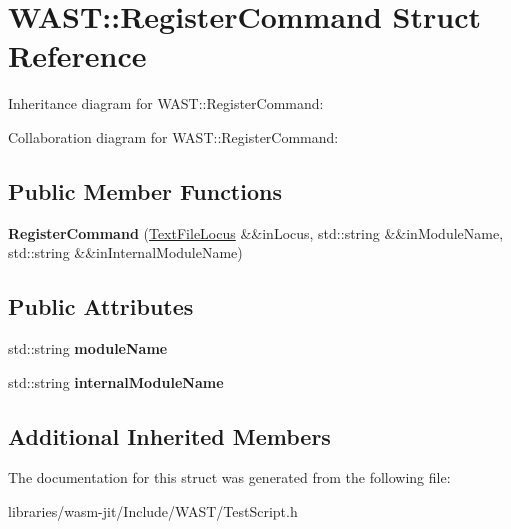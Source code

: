 \hypertarget{struct_w_a_s_t_1_1_register_command}{}\section{W\+A\+ST\+:\+:Register\+Command Struct Reference}
\label{struct_w_a_s_t_1_1_register_command}


Inheritance diagram for W\+A\+ST\+:\+:Register\+Command\+:


Collaboration diagram for W\+A\+ST\+:\+:Register\+Command\+:
\subsection*{Public Member Functions}
\begin{DoxyCompactItemize}
\item 
\mbox{\label{struct_w_a_s_t_1_1_register_command_a42cfdd77df0d599b1880aed50a6c043a}} 
{\bfseries Register\+Command} (\mbox{\hyperlink{struct_w_a_s_t_1_1_text_file_locus}{Text\+File\+Locus}} \&\&in\+Locus, std\+::string \&\&in\+Module\+Name, std\+::string \&\&in\+Internal\+Module\+Name)
\end{DoxyCompactItemize}
\subsection*{Public Attributes}
\begin{DoxyCompactItemize}
\item 
\mbox{\label{struct_w_a_s_t_1_1_register_command_abc84fb3878adbcbdd4e79d2b0cd803d9}} 
std\+::string {\bfseries module\+Name}
\item 
\mbox{\label{struct_w_a_s_t_1_1_register_command_a2ac797ee6a25d996ba0098ac0e385caa}} 
std\+::string {\bfseries internal\+Module\+Name}
\end{DoxyCompactItemize}
\subsection*{Additional Inherited Members}


The documentation for this struct was generated from the following file\+:\begin{DoxyCompactItemize}
\item 
libraries/wasm-\/jit/\+Include/\+W\+A\+S\+T/Test\+Script.\+h\end{DoxyCompactItemize}
